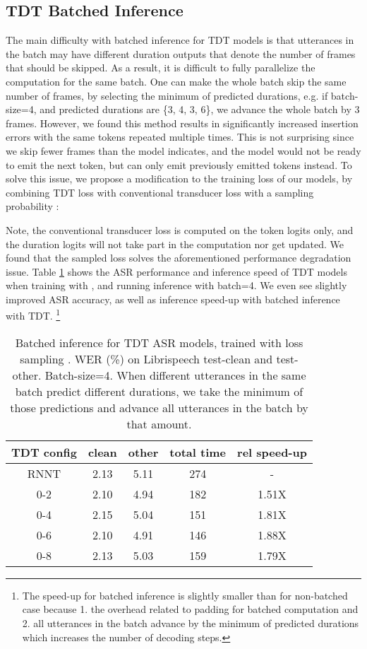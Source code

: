 \documentclass{article}
\begin{document}
\subsection{TDT Batched Inference}\label{batch}
The main difficulty with batched inference for TDT models is that utterances in the batch may have different duration outputs that denote the number of frames that should be skipped. As a result, it is difficult to fully parallelize the computation for the same batch. One can make the whole batch skip the same number of frames, by selecting the minimum of predicted  durations, e.g. if batch-size=4, and predicted durations are \{3, 4, 3, 6\}, we advance the whole batch by 3 frames. However,  we found this method  results in significantly increased insertion errors with  the same tokens repeated multiple times. This is not surprising since we skip fewer frames than the model indicates, and the model would not be ready to emit the next token, but can only emit previously emitted tokens instead. 
To solve this issue, we propose a modification to the training loss of our models, by combining TDT loss with conventional transducer loss  with a sampling probability :

Note, the conventional transducer loss  is  computed on the token logits only, and the duration logits will not take part in the computation nor get updated.
We found that the sampled loss  solves the aforementioned performance degradation issue. Table \ref{loss_combination} shows the ASR performance and inference speed of TDT models when training with , and running inference with batch=4. We even see slightly improved ASR accuracy, as well as inference speed-up with batched inference with TDT. \footnote{The speed-up for batched inference is slightly smaller than for non-batched case because 1. the overhead related to padding for batched computation and 2. all utterances in the batch advance by the minimum of predicted durations which increases the number of decoding steps.}
\begin{table}[h!]
    \centering
    \begin{tabular}{c c c c c}
    \toprule
       TDT config  & clean & other  & total time & rel speed-up\\
       \midrule
        RNNT & 2.13 & 5.11 & 274 & -     \\
        
        0-2     & 2.10 & 4.94 & 182 & 1.51X \\
        0-4     & 2.15 & 5.04 & 151 & 1.81X \\
        0-6     & 2.10 & 4.91 & 146 & 1.88X \\
        0-8     & 2.13 & 5.03 & 159 & 1.79X \\   
    \bottomrule
    \end{tabular}
    \caption{Batched inference for TDT ASR models, trained with loss sampling . WER (\%) on Librispeech test-clean and test-other. Batch-size=4. When different utterances in the same batch predict different durations, we take the minimum of those predictions and advance all utterances in the batch by that amount.
    }
    \label{loss_combination}
\end{table}
\end{document}
